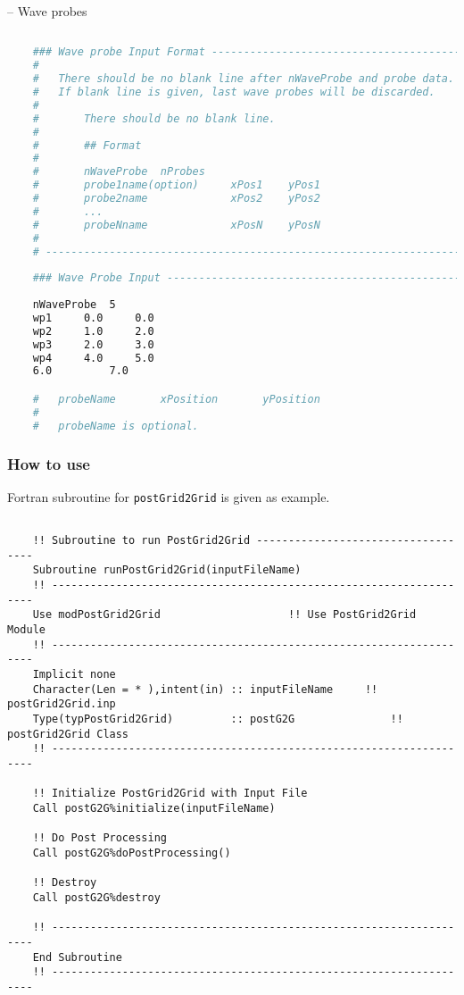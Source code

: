 	-- Wave probes
	
	\begin{lstlisting}[language=bash]
	
	### Wave probe Input Format ---------------------------------------- #
	#
	#   There should be no blank line after nWaveProbe and probe data.
	#   If blank line is given, last wave probes will be discarded.
	#
	#		There should be no blank line. 
	#
	#		## Format
	#
	# 		nWaveProbe  nProbes
	# 		probe1name(option)     xPos1    yPos1
	# 		probe2name             xPos2    yPos2
	# 		...
	# 		probeNname             xPosN    yPosN
	#
	# ------------------------------------------------------------------ #
	
	### Wave Probe Input ----------------------------------------------- #
	
	nWaveProbe  5
	wp1     0.0     0.0
	wp2     1.0     2.0
	wp3     2.0     3.0
	wp4     4.0     5.0
	6.0 		7.0	

	#	probeName		xPosition		yPosition
	#
	#	probeName is optional.
	\end{lstlisting}	
	
	\pagebreak
	\subsubsection{How to use}
	
	Fortran subroutine for \texttt{postGrid2Grid} is given as example.
	
	\vspace{0.5cm}
	
	\begin{lstlisting}[language={[95]Fortran}]	

	!! Subroutine to run PostGrid2Grid -----------------------------------
	Subroutine runPostGrid2Grid(inputFileName)
	!! -------------------------------------------------------------------
	Use modPostGrid2Grid					!! Use PostGrid2Grid Module
	!! -------------------------------------------------------------------
	Implicit none	
	Character(Len = * ),intent(in) :: inputFileName		!! postGrid2Grid.inp	
	Type(typPostGrid2Grid)         :: postG2G				!! postGrid2Grid Class
	!! -------------------------------------------------------------------	
	
	!! Initialize PostGrid2Grid with Input File	
	Call postG2G%initialize(inputFileName)
	
	!! Do Post Processing
	Call postG2G%doPostProcessing()
	
	!! Destroy
	Call postG2G%destroy
	
	!! -------------------------------------------------------------------
	End Subroutine
	!! -------------------------------------------------------------------	
	\end{lstlisting}